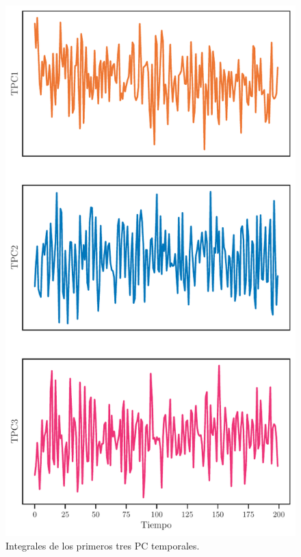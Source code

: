  \begin{figure}[h!]
	\centering\includegraphics[width=\imsize]{TPCs_robot.pdf}
	\caption[ Integrales de los primeros tres PC temporales.]{ Integrales de los primeros tres PC temporales.}\label{fig:ingegral_PCS}
\end{figure}

